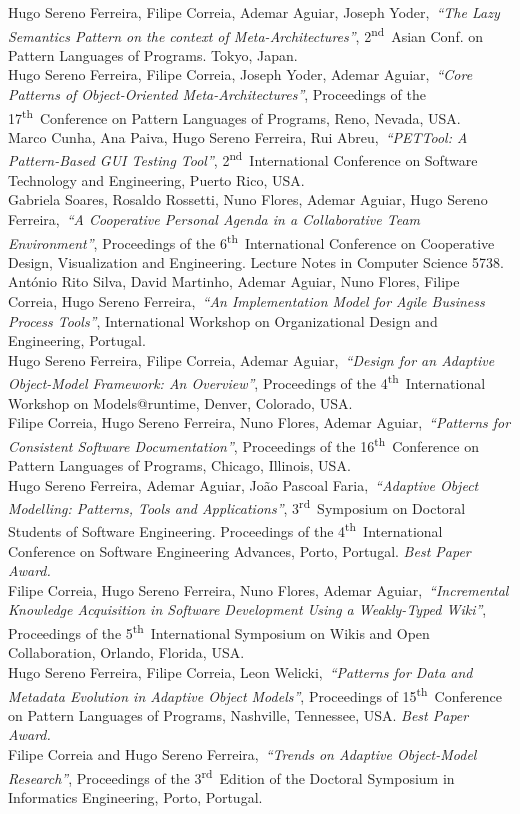 \documentclass[9pt, a4paper]{article}
\newcommand{\current}{{\hspace{-0.97em}\color{feup}$\star$}~}
\newcommand{\years}[1]{\marginnote{\small #1}}
\newcommand{\nth}{\textsuperscript{th}~}
\newcommand{\nd}{\textsuperscript{nd}~}
\newcommand{\rd}{\textsuperscript{rd}~}
\begin{document}
\years{2011}Hugo Sereno Ferreira, Filipe Correia, Ademar Aguiar, Joseph Yoder,~\emph{``The Lazy Semantics Pattern on the context of Meta-Architectures''}, 2\nd Asian Conf. on Pattern Languages of Programs. Tokyo, Japan.\\
\years{2010}Hugo Sereno Ferreira, Filipe Correia, Joseph Yoder, Ademar Aguiar,~\emph{``Core Patterns of Object-Oriented Meta-Architectures''}, Proceedings of the 17\nth Conference on Pattern Languages of Programs, Reno, Nevada, USA.\\
\years{2010}Marco Cunha, Ana Paiva, Hugo Sereno Ferreira, Rui Abreu,~\emph{``PETTool: A Pattern-Based GUI Testing Tool''}, 2\nd International Conference on Software Technology and Engineering, Puerto Rico, USA.\\
\years{2009}Gabriela Soares, Rosaldo Rossetti, Nuno Flores, Ademar Aguiar, Hugo Sereno Ferreira,~\emph{``A Cooperative Personal Agenda in a Collaborative Team Environment''}, Proceedings of the 6\nth International Conference on Cooperative Design, Visualization and Engineering. Lecture Notes in Computer Science 5738.\\
\years{2009}António Rito Silva, David Martinho, Ademar Aguiar, Nuno Flores, Filipe Correia, Hugo Sereno Ferreira,~\emph{``An Implementation Model for Agile Business Process Tools''}, International Workshop on Organizational Design and Engineering, Portugal.\\
\years{2009}Hugo Sereno Ferreira, Filipe Correia, Ademar Aguiar,~\emph{``Design for an Adaptive Object-Model Framework: An Overview''}, Proceedings of the 4\nth International Workshop on Models@runtime, Denver, Colorado, USA.\\
\years{2009}Filipe Correia, Hugo Sereno Ferreira, Nuno Flores, Ademar Aguiar,~\emph{``Patterns for Consistent Software Documentation''}, Proceedings of the 16\nth Conference on Pattern Languages of Programs, Chicago, Illinois, USA.\\
\years{\current~2009}Hugo Sereno Ferreira, Ademar Aguiar, João Pascoal Faria,~\emph{``Adaptive Object Modelling: Patterns, Tools and Applications''}, 3\rd Symposium on Doctoral Students of Software Engineering. Proceedings of the 4\nth International Conference on Software Engineering Advances, Porto, Portugal. {\color{feup} \emph{Best Paper Award.}}\\
\years{2009}Filipe Correia, Hugo Sereno Ferreira, Nuno Flores, Ademar Aguiar,~\emph{``Incremental Knowledge Acquisition in Software Development Using a Weakly-Typed Wiki''}, Proceedings of the 5\nth International Symposium on Wikis and Open Collaboration, Orlando, Florida, USA.\\
\years{\current~2008}Hugo Sereno Ferreira, Filipe Correia, Leon Welicki,~\emph{``Patterns for Data and Metadata Evolution in Adaptive Object Models''}, Proceedings of 15\nth Conference on Pattern Languages of Programs, Nashville, Tennessee, USA. {\color{feup} \emph{Best Paper Award.}}\\
\years{2008}Filipe Correia and Hugo Sereno Ferreira,~\emph{``Trends on Adaptive Object-Model Research''}, Proceedings of the 3\rd Edition of the Doctoral Symposium in Informatics Engineering, Porto, Portugal.
\end{document}

